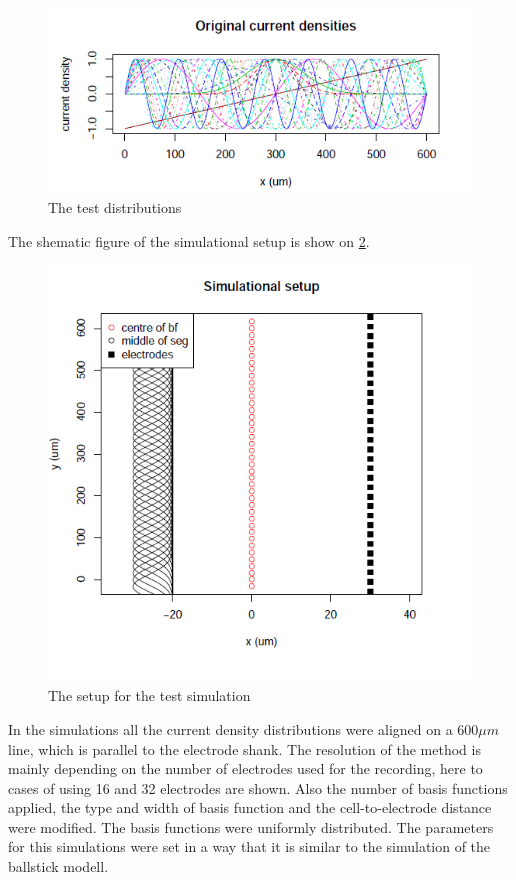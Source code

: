\documentclass[12pt,a4paper]{article}
\begin{document}
\begin{figure}[h]
\centering
\includegraphics[width= 10 cm]{plots/distributions.png}
\caption{The test distributions}
\label{fig:distribution}
\end{figure}




The shematic figure of the simulational setup is show on \ref{fig: test_setup}.


\begin{figure}[h]
\centering
\includegraphics[width= 10 cm]{plots/setup_test.png}
\caption{The setup for the test simulation}
\label{fig: test_setup}
\end{figure}
In the simulations all the current density distributions were aligned on a $600 \mu m$line, which is parallel to the electrode shank. The resolution of the method is mainly depending on the number of electrodes used for the recording, here to cases of using 16 and 32 electrodes are shown. Also the number of basis functions applied, the type and width of basis function and the cell-to-electrode distance were modified. The basis functions were uniformly distributed. The parameters for this simulations were set in a way that it is similar to the simulation of the ballstick modell.
\end{document}
